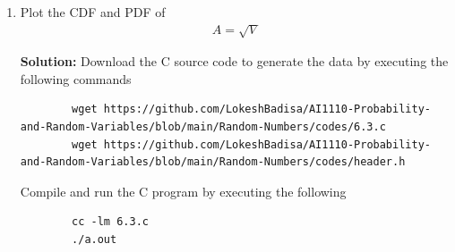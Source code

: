 \documentclass[journal,12pt,twocolumn]{IEEEtran}
\newcommand{\solution}{\noindent \textbf{Solution: }}
\numberwithin{equation}{section}
\renewcommand\thesection{\arabic{section}}
\begin{document}
\begin{enumerate}[label=\thesection.\arabic*,ref=\thesection.\theenumi]
	\item Plot the CDF and PDF of
	\begin{align}
		A = \sqrt{V}
	\end{align}
	
	\solution Download the C source code to generate the data by executing the following commands
	\begin{lstlisting}
		wget https://github.com/LokeshBadisa/AI1110-Probability-and-Random-Variables/blob/main/Random-Numbers/codes/6.3.c
		wget https://github.com/LokeshBadisa/AI1110-Probability-and-Random-Variables/blob/main/Random-Numbers/codes/header.h
	\end{lstlisting}
	Compile and run the C program by executing the following
	\begin{lstlisting}
		cc -lm 6.3.c
		./a.out
	\end{lstlisting}
	

\end{enumerate}
\end{document}
